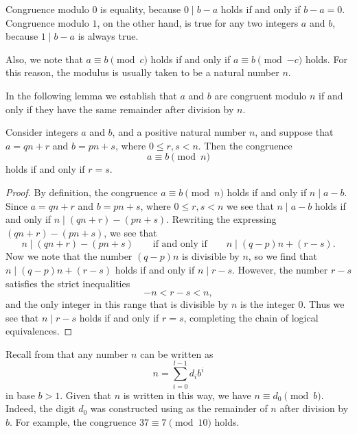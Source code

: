 \begin{remark}
  Congruence modulo $0$ is equality, because $0\mid b-a$ holds if and only if $b-a=0$. Congruence modulo $1$, on the other hand, is true for any two integers $a$ and $b$, because $1\mid b-a$ is always true.

  Also, we note that $a\equiv b\pmod{c}$ holds if and only if $a\equiv b\pmod{{-}c}$ holds. For this reason, the modulus is usually taken to be a natural number $n$.
\end{remark}

In the following lemma we establish that $a$ and $b$ are congruent modulo $n$ if and only if they have the same remainder after division by $n$.

\begin{lemma}
  Consider integers $a$ and $b$, and a positive natural number $n$, and suppose that $a=qn+r$ and $b=pn+s$, where $0\leq r,s<n$. Then the congruence
  \begin{equation*}
    a\equiv b\pmod{n}
  \end{equation*}
  holds if and only if $r=s$.
\end{lemma}

\begin{proof}
  By definition, the congruence $a\equiv b\pmod{n}$ holds if and only if $n\mid a-b$. Since $a=qn+r$ and $b=pn+s$, where $0\leq r,s<n$ we see that $n\mid a-b$ holds if and only if $n\mid (qn+r)-(pn+s)$. Rewriting the expressing $(qn+r)-(pn+s)$, we see that
  \begin{equation*}
    n\mid (qn+r)-(pn+s)\qquad\text{if and only if}\qquad n\mid (q-p)n+(r-s).
  \end{equation*}
  Now we note that the number $(q-p)n$ is divisible by $n$, so we find that $n\mid (q-p)n+(r-s)$ holds if and only if $n\mid r-s$. However, the number $r-s$ satisfies the strict inequalities
  \begin{equation*}
    -n<r-s<n,
  \end{equation*}
  and the only integer in this range that is divisible by $n$ is the integer $0$. Thus we see that $n\mid r-s$ holds if and only if $r=s$, completing the chain of logical equivalences.
\end{proof}

\begin{example}
  Recall from  that any number $n$ can be written as
  \begin{equation*}
    n = \sum_{i=0}^{l-1} d_i b^{i}
  \end{equation*}
  in base $b>1$. Given that $n$ is written in this way, we have $n \equiv d_0\pmod b$. Indeed, the digit $d_0$ was constructed using  as the remainder of $n$ after division by $b$. For example, the congruence $37 \equiv 7\pmod{10}$ holds.
\end{example}

